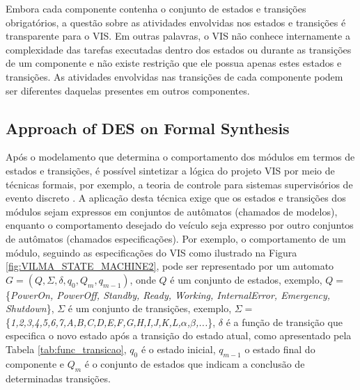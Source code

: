 \documentclass[conference]{IEEEtran}
\begin{document}
Embora cada componente contenha o conjunto de estados e transições obrigatórios, a questão sobre as atividades envolvidas nos estados e transições é transparente para o VIS. Em outras palavras, o VIS não conhece internamente a complexidade das tarefas executadas dentro dos estados ou durante as transições de um componente e não existe restrição que ele possua apenas estes estados e transições. As atividades envolvidas nas transições de cada componente podem ser diferentes daquelas presentes em outros componentes.

%
\subsection{Approach of DES on Formal Synthesis }\label{subsec:formal_synthesis}

Após o modelamento que determina o comportamento dos módulos em termos de estados e transições, é possível sintetizar a lógica do projeto VIS por meio de técnicas formais, por exemplo, a teoria de controle para sistemas supervisórios de evento discreto \cite{event_systems}. 
A aplicação desta técnica exige que os estados e transições dos módulos sejam expressos em conjuntos de autômatos (chamados de modelos), enquanto o comportamento desejado do veículo seja expresso por outro conjuntos de autômatos (chamados especificações). 
Por exemplo, o comportamento de um módulo, seguindo as especificações do VIS como ilustrado na Figura \ref{fig:VILMA_STATE_MACHINE2}, pode ser representado por um automato $G = (Q,\Sigma,\delta,q_{0},Q_{m},q_{m-1})$, onde $Q$ é um conjunto de estados, exemplo, $Q =$ \{\textit{PowerOn, PowerOff, Standby, Ready, Working, InternalError, Emergency, Shutdown}\}, $\Sigma$ é um conjunto de transições, exemplo, $\Sigma =$ \{\textit{1,2,3,4,5,6,7,A,B,C,D,E,F,G,H,I,J,K,L,$\alpha$,$\beta$,...}\}, $\delta$ é a função de transição que especifica o novo estado após a transição do estado atual, como apresentado pela Tabela \ref{tab:func_transicao}, $q_{0}$ é o estado inicial, $q_{m-1}$ o estado final do componente e $Q_{m}$ é o conjunto de estados que indicam a conclusão de determinadas transições.
\end{document}

